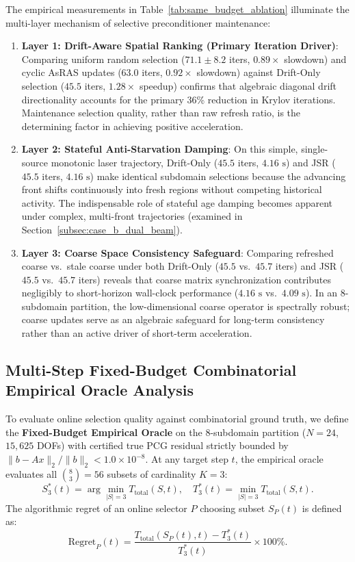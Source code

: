\documentclass[preprint,12pt,3p]{elsarticle}
\begin{document}
The empirical measurements in Table~\ref{tab:same_budget_ablation} illuminate the multi-layer mechanism of selective preconditioner maintenance:
\begin{enumerate}
    \item \textbf{Layer 1: Drift-Aware Spatial Ranking (Primary Iteration Driver)}: Comparing uniform random selection ($71.1 \pm 8.2$ iters, $0.89\times$ slowdown) and cyclic AsRAS updates ($63.0$ iters, $0.92\times$ slowdown) against Drift-Only selection ($45.5$ iters, $1.28\times$ speedup) confirms that algebraic diagonal drift directionality accounts for the primary 36\% reduction in Krylov iterations. Maintenance selection quality, rather than raw refresh ratio, is the determining factor in achieving positive acceleration.
    \item \textbf{Layer 2: Stateful Anti-Starvation Damping}: On this simple, single-source monotonic laser trajectory, Drift-Only ($45.5$ iters, $4.16\text{ s}$) and JSR ($45.5$ iters, $4.16\text{ s}$) make identical subdomain selections because the advancing front shifts continuously into fresh regions without competing historical activity. The indispensable role of stateful age damping becomes apparent under complex, multi-front trajectories (examined in Section~\ref{subsec:case_b_dual_beam}).
    \item \textbf{Layer 3: Coarse Space Consistency Safeguard}: Comparing refreshed coarse vs.\ stale coarse under both Drift-Only ($45.5$ vs.\ $45.7$ iters) and JSR ($45.5$ vs.\ $45.7$ iters) reveals that coarse matrix synchronization contributes negligibly to short-horizon wall-clock performance ($4.16\text{ s}$ vs.\ $4.09\text{ s}$). In an 8-subdomain partition, the low-dimensional coarse operator is spectrally robust; coarse updates serve as an algebraic safeguard for long-term consistency rather than an active driver of short-term acceleration.
\end{enumerate}

\subsection{Multi-Step Fixed-Budget Combinatorial Empirical Oracle Analysis}
\label{subsec:oracle_regret}

To evaluate online selection quality against combinatorial ground truth, we define the \textbf{Fixed-Budget Empirical Oracle} on the 8-subdomain partition ($N=24$, $15,625$ DOFs) with certified true PCG residual strictly bounded by $\|b - A x\|_2 / \|b\|_2 < 1.0 \times 10^{-8}$. At any target step $t$, the empirical oracle evaluates all $\binom{8}{3} = 56$ subsets of cardinality $K=3$:
\begin{equation}
S_3^*(t) = \arg\min_{|S|=3} T_{\text{total}}(S, t), \quad T_3^*(t) = \min_{|S|=3} T_{\text{total}}(S, t).
\end{equation}
The algorithmic regret of an online selector $P$ choosing subset $S_P(t)$ is defined as:
\begin{equation}
\text{Regret}_P(t) = \frac{T_{\text{total}}(S_P(t), t) - T_3^*(t)}{T_3^*(t)} \times 100\%.
\end{equation}
\end{document}
